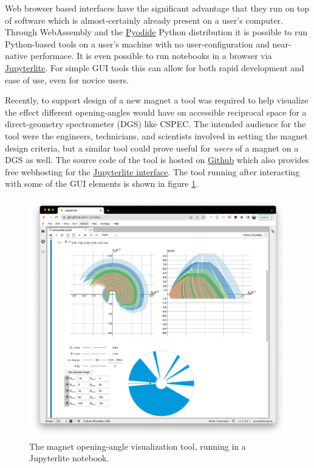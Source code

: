 \documentclass[a4paper, twocolumn, 10pt, revision]{ess}
\begin{document}
Web browser based interfaces have the significant advantage that they run on top of software which is almost-certainly
already present on a user's computer.
Through WebAssembly and the \href{https://pyodide.org/}{Pyodide} Python distribution it is possible
to run Python-based tools on a user's machine with no user-configuration and near-native performace.
It is even possible to run notebooks in a browser via \href{https://jupyterlite.readthedocs.io/}{Jupyterlite}.
For simple GUI tools this can allow for both rapid development and ease of use, even for novice users.

Recently, to support design of a new magnet a tool was required to help visualize the effect different opening-angles would have on accessible reciprocal space
for a direct-geometry spectrometer (DGS) like CSPEC.
The intended audience for the tool were the engineers, technicians, and scientists involved in setting the magnet design criteria,
but a similar tool could prove useful for \emph{users} of a magnet on a DGS as well.
The source code of the tool is hosted on
\href{https://github.com/g5t/tof-tools/}{Github}
which also provides free webhosting for the
\href{https://g5t.github.io/tof-tools/lab?path=accessible.ipynb}{Jupyterlite interface}.
The tool running after interacting with some of the GUI elements is shown in figure \ref{fig:tof-tool}.

\begin{figure}
\begin{centering}
	\includegraphics[width=\columnwidth]{tof-tool}
\end{centering}
\caption{The magnet opening-angle visualization tool, running in a Jupyterlite notebook. \label{fig:tof-tool}}
\end{figure}



\printbibliography
\end{document}
